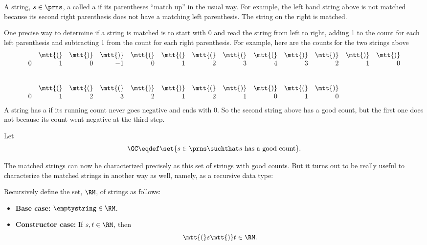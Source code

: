 A string, $s \in \prns$, a called a  if its
parentheses ``match up'' in the usual way.  For example, the left hand
string above is not matched because its second right parenthesis does not
have a matching left parenthesis.  The string on the right is matched.

One precise way to determine if a string is matched is to start with 0 and
read the string from left to right, adding 1 to the count for each left
parenthesis and subtracting 1 from the count for each right parenthesis.
For example, here are the counts for the two strings above
\[\begin{array}{rrrrrrrrrrrrr}
& \mtt{(} & \mtt{)} & \mtt{)} & \mtt{(} & \mtt{(} & \mtt{(} & \mtt{(} &
\mtt{(} & \mtt{)} & \mtt{)} & \mtt{)} & \mtt{)}\\
0 & 1 & 0 & -1 & 0 & 1 & 2 & 3 & 4 & 3 & 2 & 1 & 0\\
\\
\\
& \mtt{(} & \mtt{(} & \mtt{(} & \mtt{)} & \mtt{)} & \mtt{(} & \mtt{)} &
\mtt{)} & \mtt{(} & \mtt{)}\\
0 & 1 & 2 & 3 & 2 & 1 & 2 & 1 & 0 & 1 & 0
\end{array}\]
A string has a  if its running count never goes
negative and ends with 0.  So the second string above has a good count, but
the first one does not because its count went negative at the third step.
\begin{definition}\label{gc-def}
Let
\[
\GC \eqdef \set{ s \in \prns \suchthat s\ \text{has a good count}}.
\]
\end{definition}
The matched strings can now be characterized precisely as this set of
strings with good counts.  But it turns out to be really useful to
characterize the matched strings in another way as well, namely, as a
recursive data type:

\begin{definition}\label{RM-def}
Recursively define the set, $\RM$, of strings as follows:
\begin{itemize}

\item \textbf{Base case:} $\emptystring \in\RM$.

\item \textbf{Constructor case:} If $s,t \in\RM$, then
\[
\mtt{(}s\mtt{)}t \in\RM.
\]

\end{itemize}

\end{definition}


